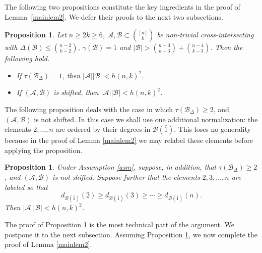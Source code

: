 \documentclass[a4paper,11pt]{article}
\newtheorem{proposition}[theorem]{Proposition}
\newcommand{\m}{\mathcal}
\begin{document}
The following two propositions constitute the key ingredients
in the proof of Lemma~\ref{mainlem2}. We defer their proofs
to the next two subsections.


\begin{proposition}\label{gamma1}
Let $n\ge 2k\ge6$, $\m A, \m B\subset {[n]\choose k}$ be non-trivial cross-intersecting with $\Delta(\m B)\le {n-2\choose k-2}$, $\gamma(\m B)=1$ and $|\m B|>{n-3\choose k-3}+{n-4\choose k-3}$. Then the following hold.
\begin{itemize}
    \item[(i)] If $\tau(\m B_{\Delta})=1$, then $|\m A||\m B|<h(n,k)^2$.  
    \item[(ii)] If $(\mathcal A,\mathcal B)$ is shifted, then $|\m A||\m B|<h(n,k)^2$. 
\end{itemize} 
\end{proposition}

The following proposition deals with the case in which $\tau(\mathcal B_\Delta)\ge2$, and $(\m A, \m B)$ is not shifted. In this case we
shall use one additional normalization: the elements $2,\ldots,n$ are
ordered by their degrees in $\mathcal B(\bar1)$. This loses no generality
because in the proof of Lemma \ref{mainlem2} we may relabel these elements
before applying the proposition.

\begin{proposition}\label{cover2-nonshifted}
Under Assumption \ref{asm}, suppose, in addition, that
$\tau(\m B_{\Delta})\ge 2$, and $(\mathcal A,\mathcal B)$ is not shifted.
Suppose further that the elements $2,3,\ldots,n$ are labeled so that
\begin{equation}\label{degree-normalization}
d_{\mathcal B(\bar1)}(2)\ge d_{\mathcal B(\bar1)}(3)
\ge \cdots \ge d_{\mathcal B(\bar1)}(n).
\end{equation}
Then
$|\m A||\m B|< h(n,k)^2$.
\end{proposition}



The proof of Proposition \ref{cover2-nonshifted} is the most technical part
of the argument. We postpone it to the next subsection. Assuming
Proposition \ref{cover2-nonshifted}, we now complete the proof of
Lemma \ref{mainlem2}.
\end{document}
